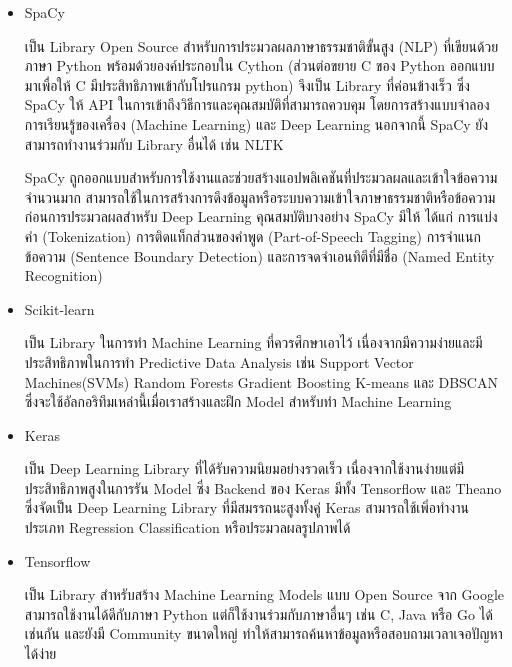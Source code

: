 \documentclass[12pt,oneside,openright,a4paper]{cpe-thai-project}
\begin{document}
\begin{itemize}
      \item SpaCy
      
      \hspace{1cm}เป็น Library Open Source สำหรับการประมวลผลภาษาธรรมชาติขั้นสูง (NLP) 
      ที่เขียนด้วยภาษา Python พร้อมด้วยองค์ประกอบใน Cython (ส่วนต่อขยาย C ของ Python ออกแบบมาเพื่อให้ C มีประสิทธิภาพเข้ากับโปรแกรม python) 
      จึงเป็น Library ที่ค่อนข้างเร็ว ซึ่ง SpaCy ให้ API ในการเข้าถึงวิธีการและคุณสมบัติที่สามารถควบคุม โดยการสร้างแบบจำลองการเรียนรู้ของเครื่อง (Machine Learning) และ Deep Learning
      นอกจากนี้ SpaCy ยังสามารถทำงานร่วมกับ Library อื่นได้ เช่น NLTK
      
      \hspace{1cm}SpaCy ถูกออกแบบสำหรับการใช้งานและช่วยสร้างแอปพลิเคชันที่ประมวลผลและเข้าใจข้อความจำนวนมาก 
      สามารถใช้ในการสร้างการดึงข้อมูลหรือระบบความเข้าใจภาษาธรรมชาติหรือข้อความก่อนการประมวลผลสำหรับ Deep Learning 
      คุณสมบัติบางอย่าง SpaCy มีให้ ได้แก่ การแบ่งคำ (Tokenization) การติดแท็กส่วนของคำพูด (Part-of-Speech Tagging)
      การจำแนกข้อความ (Sentence Boundary Detection) และการจดจำเอนทิตีที่มีชื่อ (Named Entity Recognition) \cite{spacy}
      
      \item Scikit-learn
      
      \hspace{1cm}เป็น Library ในการทำ Machine Learning ที่ควรศึกษาเอาไว้ เนื่องจากมีความง่ายและมีประสิทธิภาพในการทำ Predictive Data Analysis 
      เช่น Support Vector Machines(SVMs) Random Forests Gradient Boosting K-means และ DBSCAN 
      ซึ่งจะใช้อัลกอริทึมเหล่านี้เมื่อเราสร้างและฝึก Model สำหรับทำ Machine Learning \cite{pylib}
      
      \item Keras
      
      \hspace{1cm}เป็น Deep Learning Library ที่ได้รับความนิยมอย่างรวดเร็ว เนื่องจากใช้งานง่ายแต่มีประสิทธิภาพสูงในการรัน Model 
      ซึ่ง Backend ของ Keras มีทั้ง Tensorflow และ Theano ซึ่งจัดเป็น Deep Learning Library ที่มีสมรรถนะสูงทั้งคู่
      Keras สามารถใช้เพิ่อทำงานประเภท Regression Classification หรือประมวลผลรูปภาพได้ \cite{pylib}
      
      \item Tensorflow
      
      \hspace{1cm}เป็น Library สำหรับสร้าง Machine Learning Models แบบ Open Source จาก Google สามารถใช้งานได้ดีกับภาษา Python 
      แต่ก็ใช้งานร่วมกับภาษาอื่นๆ เช่น C, Java หรือ Go ได้เช่นกัน และยังมี Community ขนาดใหญ่ ทำให้สามารถค้นหาข้อมูลหรือสอบถามเวลาเจอปัญหาได้ง่าย \cite{pylib}


\end{itemize}
\end{document}
